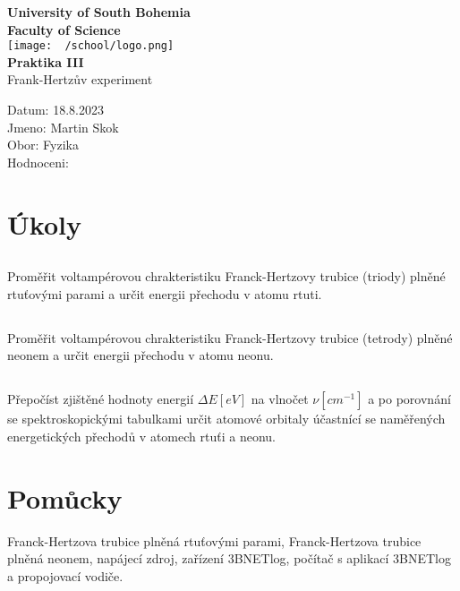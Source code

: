 \documentclass{article}
\begin{document}
\begin{center}
\textbf{\Huge{University of South Bohemia}}\\
\vspace{50px}
\textbf{\Large{Faculty of Science}} \\
\vspace{30px}
\texttt{[image: ~/school/logo.png]} \\
\vspace{30px}
\textbf{\large{Praktika III}}
\vspace{20px}
\\
\vspace{20px}
\large{Frank-Hertzův experiment} \\
\vspace{60px}
\end{center}
\begin{flushleft}
Datum: 18.8.2023 \\
Jmeno: Martin Skok \\
Obor: Fyzika \\
Hodnoceni:
\end{flushleft}
\newpage
\section{Úkoly}
\subsection{}
Proměřit voltampérovou chrakteristiku Franck-Hertzovy trubice (triody) plněné
rtuťovými parami a určit energii přechodu v atomu rtuti.
\subsection{}
Proměřit voltampérovou chrakteristiku Franck-Hertzovy trubice (tetrody) plněné
neonem a určit energii přechodu v atomu neonu.
\subsection{}
Přepočíst zjištěné hodnoty energií $\Delta E [eV]$ na vlnočet $\nu [cm^{-1}]$ a po porovnání
se spektroskopickými tabulkami určit atomové orbitaly účastnící se naměřených energetických
přechodů v atomech rtuťi a neonu.
\section{Pomůcky}
Franck-Hertzova trubice plněná rtuťovými parami, Franck-Hertzova trubice plněná neonem,
napájecí zdroj, zařízení 3BNETlog, počítač s aplikací 3BNETlog a propojovací vodiče.
\end{document}
